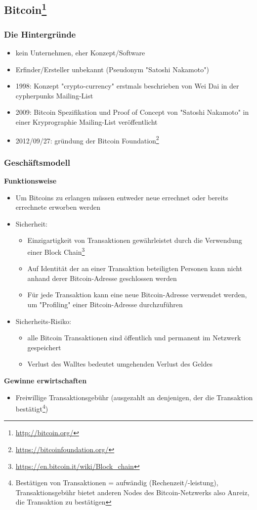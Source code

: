 \subsection[Bitcoin]{Bitcoin\footnote{\url{http://bitcoin.org/}}}
\subsubsection{Die Hintergründe}
\begin{itemize}
	\item kein Unternehmen, eher Konzept/Software
	\item Erfinder/Ersteller unbekannt (Pseudonym "Satoshi Nakamoto")
	\item 1998: Konzept "crypto-currency" erstmals beschrieben von Wei Dai in der cypherpunks Mailing-List
	\item 2009: Bitcoin Spezifikation und Proof of Concept von "Satoshi Nakamoto" in einer Kryprographie Mailing-List veröffentlicht
	\item 2012/09/27: gründung der Bitcoin Foundation\footnote{\url{https://bitcoinfoundation.org/}}
\end{itemize}
\subsubsection{Geschäftsmodell}
\textbf{Funktionsweise}
\begin{itemize}
	\item Um Bitcoins zu erlangen müssen entweder neue errechnet oder bereits errechnete erworben werden
	\item Sicherheit:
	\begin{itemize}
		\item Einzigartigkeit von Transaktionen gewährleistet durch die Verwendung einer Block Chain\footnote{\url{https://en.bitcoin.it/wiki/Block_chain}}
		\item Auf Identität der an einer Transaktion beteiligten Personen kann nicht anhand derer Bitcoin-Adresse geschlossen werden
		\item Für jede Transaktion kann eine neue Bitcoin-Adresse verwendet werden, um "Profiling" einer Bitcoin-Adresse durchzuführen
	\end{itemize}
	\item Sicherheits-Risiko:
	\begin{itemize}
		\item alle Bitcoin Transaktionen sind öffentlich und permanent im Netzwerk gespeichert
		\item Verlust des Walltes bedeutet umgehenden Verlust des Geldes
	\end{itemize}
\end{itemize}
\textbf{Gewinne erwirtschaften}
\begin{itemize}
	\item Freiwillige Transaktionsgebühr (ausgezahlt an denjenigen, der die Transaktion bestätigt\footnote{Bestätigen von Transaktionen = aufwändig (Rechenzeit/-leistung), Transaktionsgebühr bietet anderen Nodes des Bitcoin-Netzwerks also Anreiz, die Transaktion zu bestätigen})
\end{itemize}

